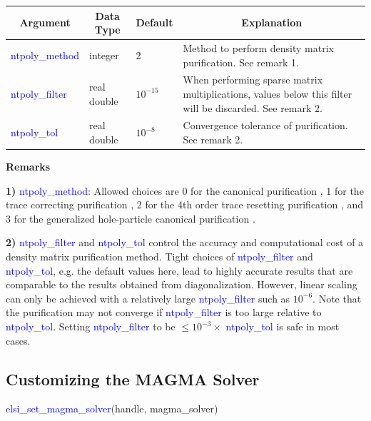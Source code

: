 \documentclass{report}
\newcommand{\tcb}[1]{\textcolor{blue}{#1}}
\begin{document}
\begin{tabular}[]{|p{30mm}|p{20mm}|p{15mm}|p{100mm}|}
\hline
\multicolumn{1}{|c|}{\textbf{Argument}} & \multicolumn{1}{c|}{\textbf{Data Type}} & \multicolumn{1}{c|}{\textbf{Default}} & \multicolumn{1}{c|}{\textbf{Explanation}}\\
\hline
\tcb{ntpoly\_method} & integer     & 2          & Method to perform density matrix purification. See remark 1.\\
\hline
\tcb{ntpoly\_filter} & real double & $10^{-15}$ & When performing sparse matrix multiplications, values below this filter will be discarded. See remark 2.\\
\hline
\tcb{ntpoly\_tol}    & real double & $10^{-8}$  & Convergence tolerance of purification. See remark 2.\\
\hline
\end{tabular}

\textbf{Remarks}

\textbf{1)} \tcb{ntpoly\_method}: Allowed choices are 0 for the canonical purification \cite{purification_palser_1998}, 1 for the trace correcting purification \cite{purification_niklasson_2002}, 2 for the 4th order trace resetting purification \cite{purification_niklasson_2002}, and 3 for the generalized hole-particle canonical purification \cite{purification_truflandier_2016}.

\textbf{2)} \tcb{ntpoly\_filter} and \tcb{ntpoly\_tol} control the accuracy and computational cost of a density matrix purification method. Tight choices of \tcb{ntpoly\_filter} and \tcb{ntpoly\_tol}, e.g. the default values here, lead to highly accurate results that are comparable to the results obtained from diagonalization. However, linear scaling can only be achieved with a relatively large \tcb{ntpoly\_filter} such as $10^{-6}$. Note that the purification may not converge if \tcb{ntpoly\_filter} is too large relative to \tcb{ntpoly\_tol}. Setting \tcb{ntpoly\_filter} to be $\le 10^{-3} \times $ \tcb{ntpoly\_tol} is safe in most cases.

\subsection{Customizing the MAGMA Solver}
\label{subsec:setter_magma}
\begin{labeling}{\hspace{6cm}}
\item [\hspace{0.3cm} \tcb{elsi\_set\_magma\_solver}(handle, magma\_solver)]
\end{labeling}
\end{document}
